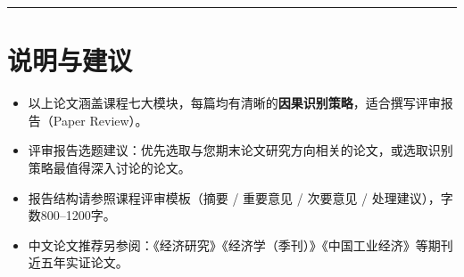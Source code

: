 \documentclass[12pt, a4paper]{article}
\begin{document}
\bigskip
\noindent\rule{\linewidth}{0.4pt}

\section*{说明与建议}

\begin{itemize}[itemsep=0.5em]
  \item 以上论文涵盖课程七大模块，每篇均有清晰的\textbf{因果识别策略}，适合撰写评审报告（Paper Review）。
  \item 评审报告选题建议：优先选取与您期末论文研究方向相关的论文，或选取识别策略最值得深入讨论的论文。
  \item 报告结构请参照课程评审模板（摘要 / 重要意见 / 次要意见 / 处理建议），字数800--1200字。
  \item 中文论文推荐另参阅：《经济研究》《经济学（季刊）》《中国工业经济》等期刊近五年实证论文。
\end{itemize}
\end{document}
